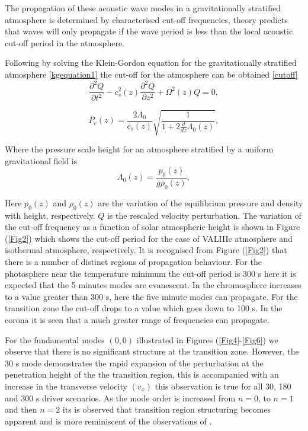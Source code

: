 \documentclass[authoryear,final,1p]{elsarticle}
\begin{document}
The propagation of these acoustic wave modes in a gravitationally stratified atmosphere is determined by characterised cut-off frequencies, theory predicts that waves will only propagate if the wave period is less than the local acoustic cut-off period in the atmosphere.

Following \citet{Taroyan2008} by solving the Klein-Gordon equation for the gravitationally stratified atmosphere \eqref{kgequation1} the cut-off for the atmosphere can be obtained \eqref{cutoff}
\begin{equation}
\frac{\partial^2 Q}{\partial t^2} - c_s^2(z) \frac{\partial^2 Q}{\partial z^2} + \Omega^2(z)Q = 0,
\label{kgequation1}
\end{equation}

\begin{equation}
P_{c}(z)=\frac{2\Lambda_0   }{ c_{s}(z)}   \sqrt{\frac{1}{1+2\frac{d}{dz}\Lambda_0(z)}},
\label{cutoff}
\end{equation}

Where the pressure scale height for an atmosphere stratified by a uniform gravitational field is
\begin{equation}
\Lambda_0(z)=\frac{p_0(z)}{g\rho_0(z)},
\label{lambda0}
\end{equation}

Here $p_0(z)$ and $\rho_0(z)$ are the variation of the equilibrium pressure and density with height, respectively. $Q$ is the 
rescaled velocity perturbation. The variation of the cut-off frequency as a function of solar atmospheric height is shown in 
Figure (\ref{Fig2}) which shows the cut-off period for the case of VALIIIc atmosphere and isothermal 
atmosphere, respectively. It is recognised from Figure (\ref{Fig2}) that there is a number of distinct 
regions of propagation behaviour. For the photosphere near the temperature minimum the cut-off period is 300 s here 
it is expected that the 5 minutes modes are evanescent. In the chromosphere increases to a value greater than 300 s, 
here the five minute modes can propagate. For the transition zone the cut-off drops to a value which goes down to 100 s. 
In the corona it is seen that a much greater range of frequencies can propagate.

For the fundamental modes $(0, 0)$  illustrated in Figures (\ref{Fig4}-\ref{Fig6})  we observe that there is no significant structure at the transition zone. However, the 30 s mode demonstrates the rapid expansion of the perturbation at the penetration height of the the transition region, this is accompanied with an increase in the transverse velocity $(v_x)$ this observation is true for all 30, 180 and 300 s driver scenarios. As the mode order is increased from $n=0$, to $n=1$ and then $n=2$ its is observed that transition region structuring becomes apparent and is more reminiscent of the observations of \citet{Malins2007B}.
\end{document}

